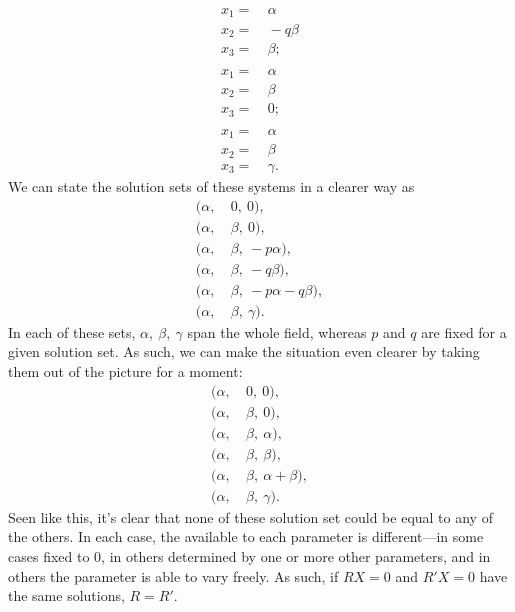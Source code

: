 \documentclass[12pt]{article}
\begin{document}
\begin{enumerate}
\begin{align*}
      x_1 =&\ \alpha\\
      x_2 =&\ -q\beta\\
      x_3 =&\ \beta;\\\\
      x_1 =&\ \alpha\\
      x_2 =&\ \beta\\
      x_3 =&\ 0;\\\\
      x_1 =&\ \alpha\\
      x_2 =&\ \beta\\
      x_3 =&\ \gamma.
    \end{align*}
    We can state the solution sets of these systems in a clearer
    way as
    \begin{align*}
      (\alpha,&\ 0,\ 0),\\
      (\alpha,&\ \beta,\ 0),\\
      (\alpha,&\ \beta,\ -p\alpha),\\
      (\alpha,&\ \beta,\ -q\beta),\\
      (\alpha,&\ \beta,\ -p\alpha -q\beta),\\
      (\alpha,&\ \beta,\ \gamma).
    \end{align*}
    In each of these sets, $\alpha,\ \beta,\ \gamma$ span the
    whole field, whereas $p$ and $q$ are fixed for a given
    solution set. As such, we can make the situation even clearer
    by taking them out of the picture for a moment:
    \begin{align*}
      (\alpha,&\ 0,\ 0),\\
      (\alpha,&\ \beta,\ 0),\\
      (\alpha,&\ \beta,\ \alpha),\\
      (\alpha,&\ \beta,\ \beta),\\
      (\alpha,&\ \beta,\ \alpha + \beta),\\
      (\alpha,&\ \beta,\ \gamma).
    \end{align*}
    Seen like this, it's clear that none of these solution set
     could be equal to any of the others. In each
    case, the  available to each parameter
    is different—in some cases fixed to $0$, in others determined
    by one or more other parameters, and in others the parameter
    is able to vary freely. As such, if $RX = 0$ and $R'X = 0$
    have the same solutions, $R = R'$.
\end{enumerate}
\end{document}
